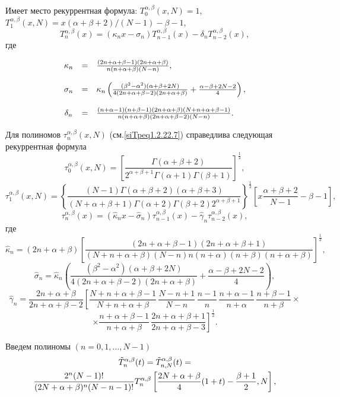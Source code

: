 Имеет место  рекуррентная формула:
$T_0^{\alpha,\beta}(x,N)=1$, $ T_1^{\alpha,\beta}(x,N)= x(\alpha+\beta+2)/(N-1)-\beta-1$,
 \begin{equation}\label{siTpeq1.2.22.26}
T_n^{\alpha,\beta}(x)=
(\kappa_nx-\sigma_n)T_{n-1}^{\alpha,\beta}(x)-\delta_nT_{n-2}^{\alpha,\beta}(x),
\end{equation}
где

$$\begin{array}{crl}\kappa_n&=&{(2n+\alpha+\beta-1)(2n+\alpha+\beta)\over
n(n+\alpha+\beta)(N-n)},\\\\\sigma_n&=&
\kappa_n\left(\frac{(\beta^2-\alpha^2)(\alpha+\beta+2N)}{4(2n+\alpha+\beta-2)
(2n+\alpha+\beta)}+\frac{\alpha-\beta+2N-2}4\right),\\\\\delta_n&=&{(n+\alpha-1)(n+\beta-1)(2n+\alpha+\beta)(N+n+\alpha+\beta-1)\over
n(n+\alpha+\beta)(2n+\alpha+\beta-2)(N-n)}.\end{array}
$$

Для полиномов $\tau_n^{\alpha,\beta}(x,N)$ (см.\eqref{siTpeq1.2.22.7}) справедлива следующая
рекуррентная формула
$$
\tau_0^{\alpha,\beta}(x,N)=\left[\frac{\Gamma(\alpha+\beta+2)}{2^{\alpha+\beta+1}\Gamma(\alpha+1)\Gamma(\beta+1)}\right]^\frac12,
$$
$$
\tau_1^{\alpha,\beta}(x,N)=\left\{\frac{(N-1)\Gamma(\alpha+\beta+2)(\alpha+\beta+3)}{(N+\alpha+\beta+1)
\Gamma(\alpha+2)\Gamma(\beta+2)2^{\alpha+\beta+1}}\right\}^\frac12\left[x\frac{\alpha+\beta+2}{N-1}-\beta-1\right],
$$
\begin{equation}\label{siTpeq1.2.22.27}
\tau_n^{\alpha,\beta}(x)=
(\hat\kappa_nx-\hat\sigma_n)\tau_{n-1}^{\alpha,\beta}(x)-\hat\gamma_n\tau_{n-2}^{\alpha,\beta}(x),
\end{equation}
где
$$
\hat\kappa_n=(2n+\alpha+\beta)\left[\frac{(2n+\alpha+\beta-1)(2n+\alpha+\beta+1)}{(N+n+\alpha+\beta)
(N-n)n(n+\alpha)(n+\beta)(n+\alpha+\beta)}\right]^\frac12,
$$
$$
\hat\sigma_n=\hat\kappa_n\left(\frac{(\beta^2-\alpha^2)(\alpha+\beta+2N)}{4(2n+\alpha+\beta-2)
(2n+\alpha+\beta)}+\frac{\alpha-\beta+2N-2}4\right),
$$
$$
\hat\gamma_n=\frac{2n+\alpha+\beta}{2n+\alpha+\beta-2}\left[\frac{N+n+\alpha+\beta-1}{N+n+\alpha+\beta}
\,\frac{N-n+1}{N-n}\,\frac{n-1}n\,\frac{n+\alpha-1}{n+\alpha}\,\frac{n+\beta-1}
{n+\beta}\right.\times
$$
$$
\times\left.\frac{n+\alpha+\beta-1}{n+\alpha+\beta}\,\frac{2n+\alpha+\beta+1}{2n+\alpha+\beta-3}\right]^\frac12.
$$





Введем полиномы $(n=0,1,\ldots,N-1)$
\begin{multline}\label{siTpeq1.2.22.28}
 \tilde T_n^{\alpha,\beta}(t)=\tilde
T_{n,N}^{\alpha,\beta}(t)=\\
{2^n(N-1)!\over(2N+\alpha+\beta)^n(N-n-1)!}
T_n^{\alpha,\beta}\left[{2N+\alpha+\beta\over4}(1+t)-{\beta+1\over 2},N\right],
\end{multline}

